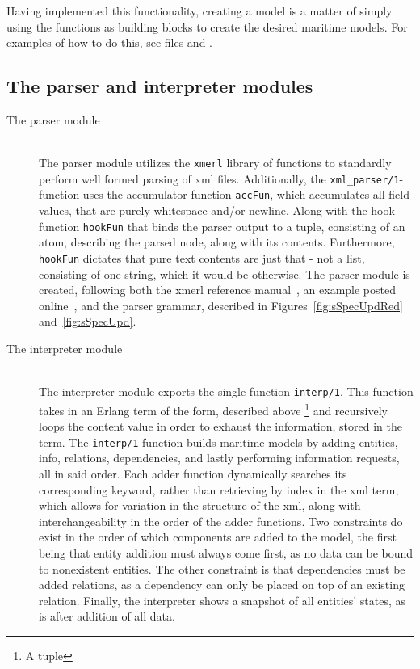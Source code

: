 Having implemented this functionality, creating a model is a matter of simply using the functions as building blocks to create the desired maritime models. For examples of how to do this, see files  and .

\subsection{The parser and interpreter modules}

\begin{description}
  \item[The parser module]\ \\
    The parser module utilizes the \lstinline{xmerl} library of functions to standardly perform well formed parsing of xml files. Additionally, the \lstinline{xml_parser/1}-function uses the accumulator function \lstinline{accFun}, which accumulates all field values, that are  purely whitespace and/or newline. Along with the hook function \lstinline{hookFun} that binds the parser output to a tuple, consisting of an atom, describing the parsed node, along with its contents. Furthermore, \lstinline{hookFun} dictates that pure text contents are just that - not a list, consisting of one string, which it would be otherwise. The parser module is created, following both the xmerl reference manual~\cite{xmerl}, an example posted online~\cite{xmerlEx}, and the parser grammar, described in Figures~\ref{fig:sSpecUpdRed} and~\ref{fig:sSpecUpd}.
  \item[The interpreter module]\ \\
    The interpreter module exports the single function \lstinline{interp/1}. This function takes in an Erlang term of the form, described above \footnote{A tuple} and recursively loops the content value in order to exhaust the information, stored in the term. The \lstinline{interp/1} function builds maritime models by adding entities, info, relations, dependencies, and lastly performing information requests, all in said order. Each adder function dynamically searches its corresponding keyword, rather than retrieving by index in the xml term, which allows for variation in the structure of the xml, along with interchangeability in the order of the adder functions. Two constraints do exist in the order of which components are added to the model, the first being that entity addition must always come first, as no data can be bound to nonexistent entities. The other constraint is that dependencies must be added  relations, as a dependency can only be placed on top of an existing relation. Finally, the interpreter shows a snapshot of all entities' states, as is after addition of all data.
\end{description}
